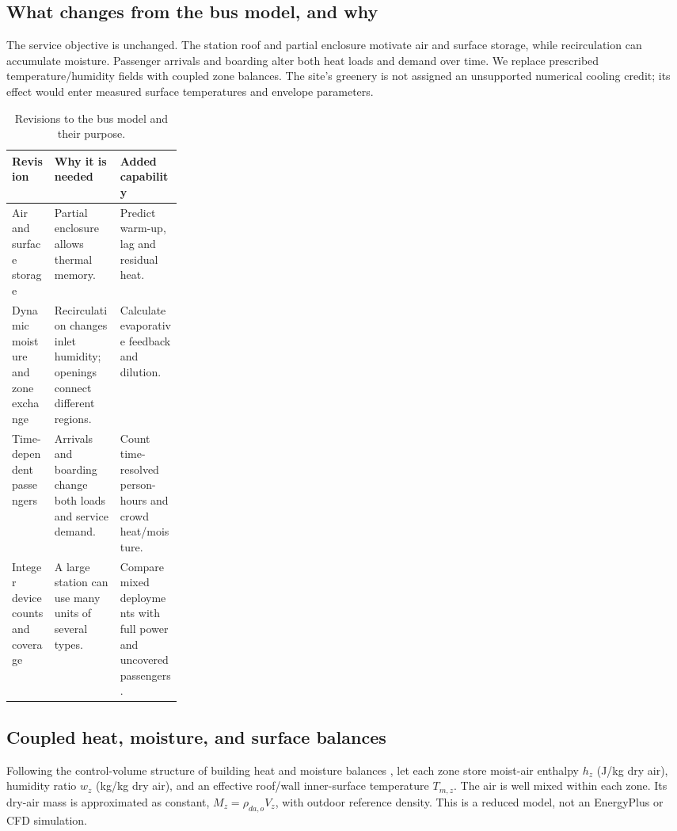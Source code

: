 \subsection{What changes from the bus model, and why}

The service objective is unchanged. The station roof and partial enclosure motivate air and surface storage, while recirculation can accumulate moisture. Passenger arrivals and boarding alter both heat loads and demand over time. We replace prescribed temperature/humidity fields with coupled zone balances. The site's greenery is not assigned an unsupported numerical cooling credit; its effect would enter measured surface temperatures and envelope parameters.

\begin{table}[!ht]
\centering\small
\caption{Revisions to the bus model and their purpose.}
\label{tab:rail-changes}
\begin{tabularx}{\linewidth}{@{}>{\raggedright\arraybackslash}p{0.25\linewidth}>{\raggedright\arraybackslash}X>{\raggedright\arraybackslash}X@{}}
\toprule
Revision & Why it is needed & Added capability\\
\midrule
Air and surface storage & Partial enclosure allows thermal memory. & Predict warm-up, lag and residual heat.\\
Dynamic moisture and zone exchange & Recirculation changes inlet humidity; openings connect different regions. & Calculate evaporative feedback and dilution.\\
Time-dependent passengers & Arrivals and boarding change both loads and service demand. & Count time-resolved person-hours and crowd heat/moisture.\\
Integer device counts and coverage & A large station can use many units of several types. & Compare mixed deployments with full power and uncovered passengers.\\
\bottomrule
\end{tabularx}
\end{table}

\subsection{Coupled heat, moisture, and surface balances}

Following the control-volume structure of building heat and moisture balances \cite{epzone}, let each zone store moist-air enthalpy $h_z$ (J/kg dry air), humidity ratio $w_z$ (kg/kg dry air), and an effective roof/wall inner-surface temperature $T_{m,z}$. The air is well mixed within each zone. Its dry-air mass is approximated as constant, $M_z=\rho_{da,o}V_z$, with outdoor reference density. This is a reduced model, not an EnergyPlus or CFD simulation.

